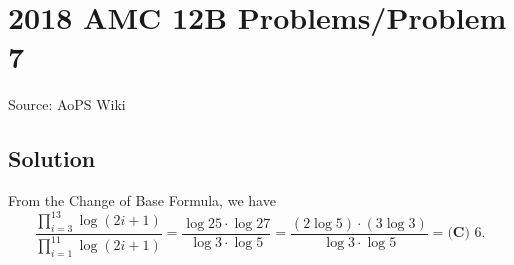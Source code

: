 \documentclass[12pt]{article}
\begin{document}
\section*{{2018 AMC 12B Problems/Problem 7}}
Source: AoPS Wiki

\subsection*{Solution}
From the Change of Base Formula, we have \[\frac{\prod_{i=3}^{13} \log (2i+1)}{\prod_{i=1}^{11}\log (2i+1)} = \frac{\log 25 \cdot \log 27}{\log 3 \cdot \log 5} = \frac{(2\log 5)\cdot(3\log 3)}{\log 3 \cdot \log 5} = \boxed{\textbf{(C) } 6}.\]
\end{document}
